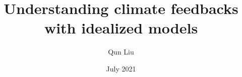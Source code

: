 \documentclass[a4paper,onehalfspacing,twoside,12pt,numbers=noenddot]{exeterthesis}
\title{Understanding climate feedbacks with idealized models}
\author{Qun Liu}
\date{July 2021}
\begin{document}



 \newpage
 \renewcommand{\nomname}{Nomenclature and Abbreviations}
 \setlength{\nomlabelwidth}{2.5cm}
 \setlength{\nomitemsep}{-\parsep}
 
 \printnomenclature
 \label{glossary}

\pagestyle{fancy}

% 
% 
% 
% 
% 



\addappheadtotoc
\appendixpage

\begin{appendices}
\renewcommand\chaptermark[1]{\markboth{\appendixname~\thechapter. #1}{}}


%

\end{appendices}

\newpage
{}

\small{

%

}


\newpage
\printindex
\end{document}
